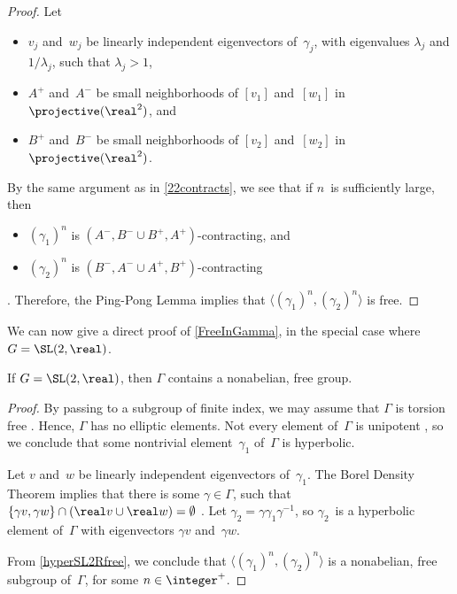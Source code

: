 \begin{proof}
 Let 
 \noprelistbreak
 \begin{itemize}
 \item $v_j$ and~$w_j$ be linearly independent eigenvectors
of~$\gamma_j$, with eigenvalues $\lambda_j$ and
$1/\lambda_j$, such that $\lambda_j > 1$,
 \item $A^+$ and~$A^-$ be small neighborhoods of $[v_1]$
and~$[w_1]$ in $\projective(\real^2)$, and
 \item $B^+$ and~$B^-$ be small neighborhoods of $[v_2]$
and~$[w_2]$ in $\projective(\real^2)$.
 \end{itemize}
 By the same argument as in \cref{22contracts}, we see
that if $n$~is sufficiently large, then
 \begin{itemize}
 \item $(\gamma_1)^n$ is $(A^-, B^- \cup B^+,
A^+)$-contracting, and
 \item $(\gamma_2)^n$ is $(B^-, A^- \cup A^+,
B^+)$-contracting
 \end{itemize}
 . Therefore, the Ping-Pong Lemma
 implies that $\langle (\gamma_1)^n,
(\gamma_2)^n \rangle$ is free.
 \end{proof}

We can now give a direct proof of \cref{FreeInGamma},
in the special case where $G = \SL(2,\real)$.

\begin{cor}
 If $G = \SL(2,\real)$, then\/ $\Gamma$ contains a
nonabelian, free group.
 \end{cor}

\begin{proof}
 By passing to a subgroup of finite index, we may assume
that $\Gamma$ is torsion free . Hence,
$\Gamma$ has no elliptic elements. Not every element
of~$\Gamma$ is unipotent , so we
conclude that some nontrivial element~$\gamma_1$
of~$\Gamma$ is hyperbolic.

Let $v$ and~$w$ be linearly independent eigenvectors
of~$\gamma_1$. The Borel Density Theorem
 implies that there is some $\gamma
\in \Gamma$, such that $\{\gamma v , \gamma w \} \cap
(\real v \cup \real w) = \emptyset$
. Let $\gamma_2 = \gamma \gamma_1
\gamma^{-1}$, so $\gamma_2$~is a hyperbolic element
of~$\Gamma$ with eigenvectors $\gamma v$ and~$\gamma w$.

From \cref{hyperSL2Rfree}, we conclude that
$\langle (\gamma_1)^n, (\gamma_2)^n \rangle$ is a
nonabelian, free subgroup of~$\Gamma$, for some $n \in
\integer^+$.
 \end{proof}

